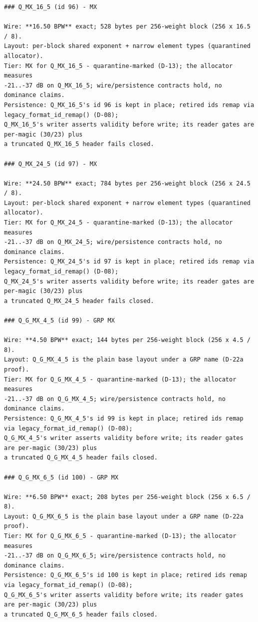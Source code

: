 \begin{Verbatim}[breaklines,breakanywhere,fontsize=\footnotesize]
### Q_MX_16_5 (id 96) - MX

Wire: **16.50 BPW** exact; 528 bytes per 256-weight block (256 x 16.5 / 8).
Layout: per-block shared exponent + narrow element types (quarantined allocator).
Tier: MX for Q_MX_16_5 - quarantine-marked (D-13); the allocator measures
-21..-37 dB on Q_MX_16_5; wire/persistence contracts hold, no dominance claims.
Persistence: Q_MX_16_5's id 96 is kept in place; retired ids remap via legacy_format_id_remap() (D-08);
Q_MX_16_5's writer asserts validity before write; its reader gates are per-magic (30/23) plus
a truncated Q_MX_16_5 header fails closed.

### Q_MX_24_5 (id 97) - MX

Wire: **24.50 BPW** exact; 784 bytes per 256-weight block (256 x 24.5 / 8).
Layout: per-block shared exponent + narrow element types (quarantined allocator).
Tier: MX for Q_MX_24_5 - quarantine-marked (D-13); the allocator measures
-21..-37 dB on Q_MX_24_5; wire/persistence contracts hold, no dominance claims.
Persistence: Q_MX_24_5's id 97 is kept in place; retired ids remap via legacy_format_id_remap() (D-08);
Q_MX_24_5's writer asserts validity before write; its reader gates are per-magic (30/23) plus
a truncated Q_MX_24_5 header fails closed.

### Q_G_MX_4_5 (id 99) - GRP MX

Wire: **4.50 BPW** exact; 144 bytes per 256-weight block (256 x 4.5 / 8).
Layout: Q_G_MX_4_5 is the plain base layout under a GRP name (D-22a proof).
Tier: MX for Q_G_MX_4_5 - quarantine-marked (D-13); the allocator measures
-21..-37 dB on Q_G_MX_4_5; wire/persistence contracts hold, no dominance claims.
Persistence: Q_G_MX_4_5's id 99 is kept in place; retired ids remap via legacy_format_id_remap() (D-08);
Q_G_MX_4_5's writer asserts validity before write; its reader gates are per-magic (30/23) plus
a truncated Q_G_MX_4_5 header fails closed.

### Q_G_MX_6_5 (id 100) - GRP MX

Wire: **6.50 BPW** exact; 208 bytes per 256-weight block (256 x 6.5 / 8).
Layout: Q_G_MX_6_5 is the plain base layout under a GRP name (D-22a proof).
Tier: MX for Q_G_MX_6_5 - quarantine-marked (D-13); the allocator measures
-21..-37 dB on Q_G_MX_6_5; wire/persistence contracts hold, no dominance claims.
Persistence: Q_G_MX_6_5's id 100 is kept in place; retired ids remap via legacy_format_id_remap() (D-08);
Q_G_MX_6_5's writer asserts validity before write; its reader gates are per-magic (30/23) plus
a truncated Q_G_MX_6_5 header fails closed.


\end{Verbatim}
